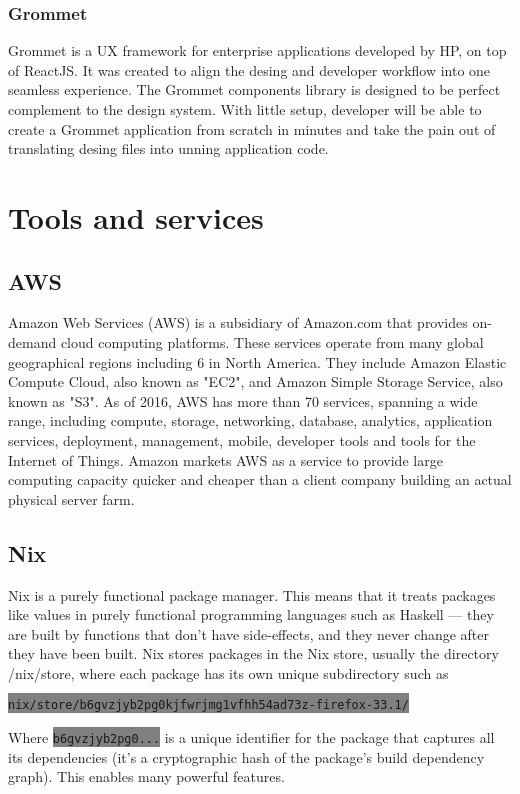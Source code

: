 \subsubsection{Grommet}
Grommet is a UX framework for enterprise applications developed by HP, on top of
ReactJS. It was created to align the desing and developer workflow into one
seamless experience. The Grommet components library is designed to be perfect
complement to the design system. With little setup, developer will be able to
create a Grommet application from scratch in minutes and take the pain out of
translating desing files into unning application code.

\section{Tools and services}
\subsection{AWS}
Amazon Web Services (AWS) is a subsidiary of Amazon.com that provides on-demand
cloud computing platforms. These services operate from many global geographical
regions including 6 in North America. They include Amazon Elastic Compute
Cloud, also known as "EC2", and Amazon Simple Storage Service, also known as
"S3". As of 2016, AWS has more than 70 services, spanning a wide range,
including compute, storage, networking, database, analytics, application
services, deployment, management, mobile, developer tools and tools for the
Internet of Things. Amazon markets AWS as a service to provide large computing
capacity quicker and cheaper than a client company building an actual physical
server farm.

\subsection{Nix}

Nix is a purely functional package manager. This means that it treats packages
like values in purely functional programming languages such as Haskell — they
are built by functions that don’t have side-effects, and they never change after
they have been built. Nix stores packages in the Nix store, usually the
directory /nix/store, where each package has its own unique subdirectory such as

\colorbox{Gray}{\lstinline{nix/store/b6gvzjyb2pg0kjfwrjmg1vfhh54ad73z-firefox-33.1/}}

Where \colorbox{Gray}{\lstinline{b6gvzjyb2pg0...}} is a unique identifier for the package that captures all its
dependencies (it’s a cryptographic hash of the package’s build dependency
graph). This enables many powerful features.

